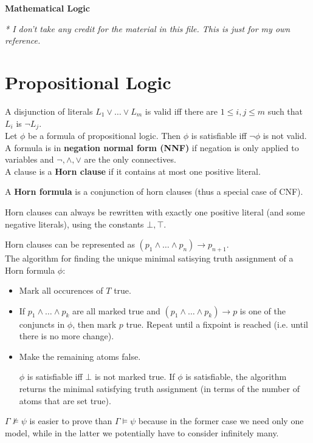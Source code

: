 \documentclass{article}
\begin{document}
\EnableBpAbbreviations
\def\ScoreOverhang{1pt}
\setlength{\parindent}{0pt}

\begin{center}
\textbf{{\huge Mathematical Logic}}
\end{center}

\emph{* I don't take any credit for the material in this file. This is just for my own reference.}
\tableofcontents
\section{Propositional Logic}
A disjunction of literals $L_1\lor\ldots\lor L_m$ is valid iff there are $1\leq i,j\leq m$ such that $L_i$ is $\neg L_j$.\\

Let $\phi$ be a formula of propositional logic. Then $\phi$ is satisfiable iff $\neg\phi$ is not valid.\\

A formula is in \textbf{negation normal form (NNF)} if negation is only applied to variables and $\neg,\land,\lor$ are the only connectives.\\

A clause is a \textbf{Horn clause} if it contains at most one positive literal.

A \textbf{Horn formula} is a conjunction of horn clauses (thus a special case of CNF).

Horn clauses can always be rewritten with exactly one positive literal (and some negative literals), using the constants $\bot,\top$.

Horn clauses can be represented as $(p_1\land\ldots\land p_n)\rightarrow p_{n+1}$.\\

The algorithm for finding the unique minimal satisying truth assignment of a Horn formula $\phi$:
\begin{itemize}
 \item Mark all occurences of $T$ true.
 \item If $p_1\land\ldots\land p_k$ are all marked true and $(p_1\land\ldots\land p_k)\rightarrow p$ is one of the conjuncts in $\phi$, then mark $p$ true. Repeat until a fixpoint is reached (i.e. until there is no more change).
 \item Make the remaining atoms false.

$\phi$ is satisfiable iff $\bot$ is not marked true. If $\phi$ is satisfiable, the algorithm returns the minimal satisfying truth assignment (in terms of the number of atoms that are set true).
\end{itemize}
$\Gamma\nvDash\psi$ is easier to prove than $\Gamma\vDash\psi$ because in the former case we need only one model, while in the latter we potentially have to consider infinitely many.
\end{document}
